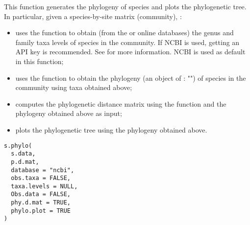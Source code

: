 \documentclass[a4paper]{book}
\begin{document}
%
\begin{Description}\relax
This  function generates the phylogeny of species and plots the phylogenetic tree. In
particular, given a species-by-site matrix (community), :
\begin{itemize}

\item{} uses the  function to obtain (from the
 or  online
databases) the genus and family taxa levels of species in the community.
If NCBI is used, getting an API key is recommended. See 
for more information. NCBI is used as default in this function;
\item{} uses the  function to obtain the phylogeny (an object
of : "") of species in the community using taxa obtained above;
\item{} computes the phylogenetic distance matrix using the 
function and the phylogeny obtained above as input;
\item{} plots the phylogenetic tree using the phylogeny obtained above.

\end{itemize}

\end{Description}
%
\begin{Usage}
\begin{verbatim}
s.phylo(
  s.data,
  p.d.mat,
  database = "ncbi",
  obs.taxa = FALSE,
  taxa.levels = NULL,
  Obs.data = FALSE,
  phy.d.mat = TRUE,
  phylo.plot = TRUE
)
\end{verbatim}
\end{Usage}
%
\end{document}

